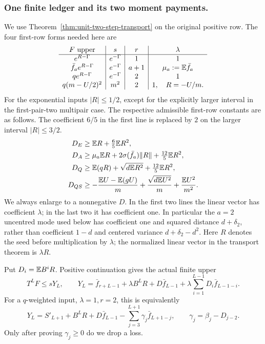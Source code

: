 \subsubsection{One finite ledger and its two moment payments.}
We use Theorem~\ref{thm:unit-two-step-transport} on the original
positive row. The four first-row forms needed here are
\begin{equation}\label{eq:unit-p:data-1}
\begin{array}{c|c|c|c}
 F\text{ upper}&s&r&\lambda\\\hline
 e^{R-\Gamma}&e^{-\Gamma}&1&1\\
 \bar f_ae^{R-\Gamma}&e^{-\Gamma}&a+1&\mu_a:=\mathbb E\bar f_a\\
 qe^{R-\Gamma}&e^{-\Gamma}&2&1\\
 q(m-U/2)^2&m^2&2&1,\quad R=-U/m.
\end{array}
\end{equation}
For the exponential inputs \(|R|\le1/2\), except for the explicitly
larger interval in the first-pair-two multipair case. The respective
admissible first-row constants are as follows. The coefficient \(6/5\)
in the first line is replaced by \(2\) on the larger interval
\(|R|\le3/2\).
\begin{equation}\label{eq:unit-p:data-2}
\begin{aligned}
 D_E&\ge \mathbb E R+\tfrac65\mathbb E R^2,\\
 D_A&\ge \mu_a\mathbb E R+
          2\sigma(\bar f_a)\|R\|+\tfrac{12}{5}\mathbb E R^2,\\
 D_Q&\ge \mathbb E(qR)+\sqrt{d\mathbb E R^2}+\tfrac{12}{5}\mathbb E R^2,\\
 D_{QS}&\ge-\frac{\mathbb E U-\mathbb E(gU)}m+
             \frac{\sqrt{d\mathbb E U^2}}m+\frac{\mathbb E U^2}{m^2}.
\end{aligned}
\end{equation}
We always enlarge to a nonnegative \(D\). In the first two lines the
linear vector has coefficient \(\lambda\); in the last two it has
coefficient one. In particular the \(a=2\) uncentred mode used below
has coefficient one and squared distance \(d+\delta_2\), rather than
coefficient \(1-d\) and centered variance \(d+\delta_2-d^2\).
Here \(R\) denotes the seed before multiplication by \(\lambda\);
the normalized linear vector in the transport theorem is
\(\lambda R\).

Put \(D_i=\mathbb E B^iR\). Positive continuation gives the actual finite
upper
\begin{equation}\label{eq:unit-p:ledger}
 T^LF\le sY_L,\qquad
 Y_L=\bar f_{r+L-1}+\lambda B^LR+D\bar f_{L-1}
       +\lambda\sum_{i=1}^{L-1}D_i\bar f_{L-1-i}.
\end{equation}
For a \(q\)-weighted input, \(\lambda=1,r=2\), this is equivalently
\begin{equation}\label{eq:unit-p:q-ledger}
 Y_L=S'_{L+1}+B^LR+D\bar f_{L-1}
             -\sum_{j=3}^{L+1}\gamma_j\bar f_{L+1-j},
 \qquad\gamma_j=\beta_j-D_{j-2}.
\end{equation}
Only after proving \(\gamma_j\ge0\) do we drop a loss.

